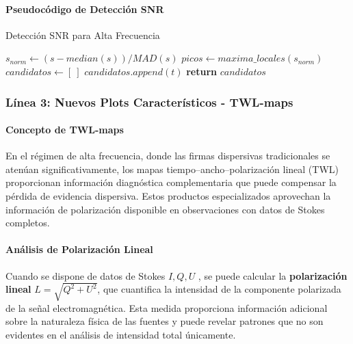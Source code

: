 \paragraph{Pseudocódigo de Detección SNR}

\begin{algorithm}[H]
\caption{Detección SNR para Alta Frecuencia}
\begin{algorithmic}[1]
    \State $s_{norm} \leftarrow (s - median(s)) / MAD(s)$
    \State $picos \leftarrow maxima\_locales(s_{norm})$
    \State $candidatos \leftarrow [\ ]$
            \State $candidatos.append(t)$
        \EndIf
    \EndFor
    \State \textbf{return} $candidatos$
\EndFunction
\end{algorithmic}
\end{algorithm}

\subsubsection{Línea 3: Nuevos Plots Característicos - TWL-maps}

\paragraph{Concepto de TWL-maps}

En el régimen de alta frecuencia, donde las firmas dispersivas tradicionales se atenúan significativamente, los mapas tiempo--ancho--polarización lineal (TWL) proporcionan información diagnóstica complementaria que puede compensar la pérdida de evidencia dispersiva. Estos productos especializados aprovechan la información de polarización disponible en observaciones con datos de Stokes completos.

\paragraph{Análisis de Polarización Lineal}

Cuando se dispone de datos de Stokes $I,Q,U$ \cite{hamaker1996understanding}, se puede calcular la \textbf{polarización lineal} $L=\sqrt{Q^2+U^2}$, que cuantifica la intensidad de la componente polarizada de la señal electromagnética. Esta medida proporciona información adicional sobre la naturaleza física de las fuentes y puede revelar patrones que no son evidentes en el análisis de intensidad total únicamente.

